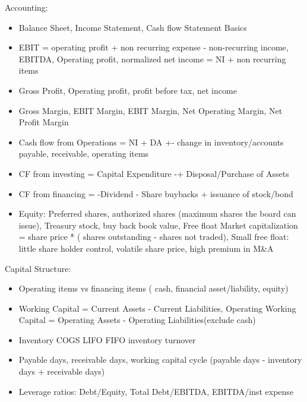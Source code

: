 \documentclass[11pt, openany]{book}              %
\begin{document}
Accounting:
\begin{itemize}
    \item Balance Sheet, Income Statement, Cash flow Statement Basics
    \item EBIT = operating profit + non recurring expense - non-recurring income, EBITDA, Operating profit, normalized net income = NI + non recurring items
    \item Gross Profit, Operating profit, profit before tax, net income
    \item Gross Margin, EBIT Margin, EBIT Margin, Net Operating Margin, Net Profit Margin 
    \item Cash flow from Operations = NI + DA +- change in inventory/accounts payable, receivable, operating items
    \item CF from investing = Capital Expenditure -+ Disposal/Purchase of Assets
    \item CF from financing = -Dividend - Share buybacks + issuance of stock/bond
    \item Equity: Preferred shares, authorized shares (maximum shares the board can issue), Treasury stock, buy back book value, Free float Market capitalization = share price * ( shares outstanding - shares not traded), Small free float: little share holder control, volatile share price, high premium in M\&A 
\end{itemize}

Capital Structure:

\begin{itemize}
	\item Operating items vs financing items ( cash, financial asset/liability, equity)
	\item Working Capital = Current Assets - Current Liabilities, Operating Working Capital = Operating Assets - Operating Liabilities(exclude cash)
	\item Inventory COGS LIFO FIFO inventory turnover
	\item Payable days, receivable days, working capital cycle (payable days - inventory days + receivable days)
	\item Leverage ratios: Debt/Equity, Total Debt/EBITDA, EBITDA/inst expense	
\end{itemize}
\end{document}

